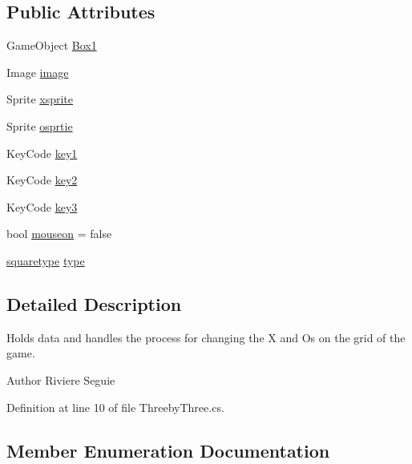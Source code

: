 \subsection*{Public Attributes}
\begin{DoxyCompactItemize}
\item 
Game\+Object \mbox{\hyperlink{class_threeby_three_a64f0787e39600142dccb43aef0f35ce5}{Box1}}
\item 
Image \mbox{\hyperlink{class_threeby_three_a883ff6e0de42a1c328f5e944c05b7563}{image}}
\item 
Sprite \mbox{\hyperlink{class_threeby_three_a8539275ae4e453b0c2b49aa0063fef7c}{xsprite}}
\item 
Sprite \mbox{\hyperlink{class_threeby_three_ae4e4051c2fca5755d7fd8c72dfa8b398}{osprtie}}
\item 
Key\+Code \mbox{\hyperlink{class_threeby_three_a4bed81364f044a89e26c9fc4d34c214f}{key1}}
\item 
Key\+Code \mbox{\hyperlink{class_threeby_three_ad73590c0cf864823d41d5707303c122f}{key2}}
\item 
Key\+Code \mbox{\hyperlink{class_threeby_three_a756006dcc122bd940a41225d9892a6ce}{key3}}
\item 
bool \mbox{\hyperlink{class_threeby_three_a298e217f694440b146df33722c29245f}{mouseon}} = false
\item 
\mbox{\hyperlink{class_threeby_three_acef42f3cc5d8ffa948e5f800edb7a407}{squaretype}} \mbox{\hyperlink{class_threeby_three_a579689ce52e962f45fd71e0f6aa6afa0}{type}}
\end{DoxyCompactItemize}


\subsection{Detailed Description}
Holds data and handles the process for changing the X and Os on the grid of the game. \begin{DoxyAuthor}{Author}
Riviere Seguie 
\end{DoxyAuthor}


Definition at line 10 of file Threeby\+Three.\+cs.



\subsection{Member Enumeration Documentation}
\mbox{\label{class_threeby_three_acef42f3cc5d8ffa948e5f800edb7a407}} 
